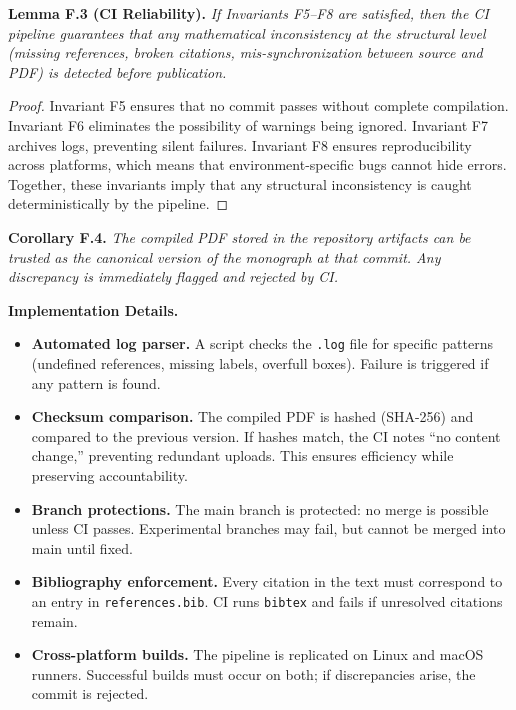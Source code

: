 \medskip
\noindent \textbf{Lemma F.3 (CI Reliability).}  
\emph{If Invariants F5–F8 are satisfied, then the CI pipeline guarantees that any mathematical inconsistency at the structural level (missing references, broken citations, mis-synchronization between source and PDF) is detected before publication.}

\begin{proof}  
Invariant F5 ensures that no commit passes without complete compilation. Invariant F6 eliminates the possibility of warnings being ignored. Invariant F7 archives logs, preventing silent failures. Invariant F8 ensures reproducibility across platforms, which means that environment-specific bugs cannot hide errors. Together, these invariants imply that any structural inconsistency is caught deterministically by the pipeline.  
\end{proof}

\medskip
\noindent \textbf{Corollary F.4.} \emph{The compiled PDF stored in the repository artifacts can be trusted as the canonical version of the monograph at that commit. Any discrepancy is immediately flagged and rejected by CI.}

\medskip
\noindent \textbf{Implementation Details.}

\begin{itemize}
  \item \textbf{Automated log parser.} A script checks the \texttt{.log} file for specific patterns (undefined references, missing labels, overfull boxes). Failure is triggered if any pattern is found.
  \item \textbf{Checksum comparison.} The compiled PDF is hashed (SHA-256) and compared to the previous version. If hashes match, the CI notes “no content change,” preventing redundant uploads. This ensures efficiency while preserving accountability.
  \item \textbf{Branch protections.} The main branch is protected: no merge is possible unless CI passes. Experimental branches may fail, but cannot be merged into main until fixed.
  \item \textbf{Bibliography enforcement.} Every citation in the text must correspond to an entry in \texttt{references.bib}. CI runs \texttt{bibtex} and fails if unresolved citations remain.
  \item \textbf{Cross-platform builds.} The pipeline is replicated on Linux and macOS runners. Successful builds must occur on both; if discrepancies arise, the commit is rejected.
\end{itemize}

